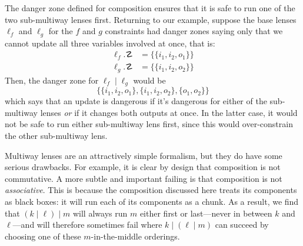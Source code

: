 The danger zone defined for composition ensures that it is safe to run one
of the two sub-multiway lenses first. Returning to our example, suppose the
base lenses $\ell_f$ and $\ell_g$ for the $f$ and $g$ constraints had danger
zones saying only that we cannot update all three variables involved at
once, that is:
\begin{align*}
    \ell_f.\danger &= \{\{i_1,i_2,o_1\}\} \\
    \ell_g.\danger &= \{\{i_1,i_2,o_2\}\}
\end{align*}
Then, the danger zone for $\ell_f \mid \ell_g$ would be
\[\{\{i_1,i_2,o_1\},\{i_1,i_2,o_2\},\{o_1,o_2\}\}\]
which says that an update is dangerous if it's dangerous for either of the
sub-multiway lenses \emph{or} if it changes both outputs at once. In the
latter case, it would not be safe to run either sub-multiway lens first,
since this would over-constrain the other sub-multiway lens.

Multiway lenses are an attractively simple formalism, but they do have some
serious drawbacks. For example, it is clear by design that composition is
not commutative. A more subtle and important failing is that composition is
not \emph{associative}. This is because the composition discussed here
treats its components as black boxes: it will run each of its components as
a chunk. As a result, we find that $(k \mid \ell) \mid m$ will always run
$m$ either first or last---never in between $k$ and $\ell$---and will
therefore sometimes fail where $k \mid (\ell \mid m)$ can succeed by
choosing one of these $m$-in-the-middle orderings.

